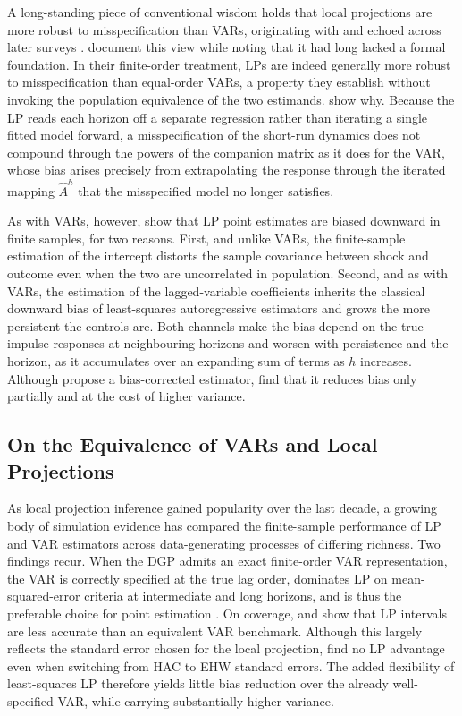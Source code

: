 A long-standing piece of conventional wisdom holds that local projections are more robust to
misspecification than VARs, originating with \textcite[162]{jorda2005estimation} and echoed across
later surveys \parencite{ramey2016macroeconomic,li2024local}. \textcite{plagborg2021local} document
this view while noting that it had long lacked a formal foundation. In their finite-order treatment,
LPs are indeed generally more robust to misspecification than equal-order VARs, a property they
establish without invoking the population equivalence of the two estimands. \textcite{olea2024double}
show why. Because the LP reads each horizon off a separate regression rather than iterating a single
fitted model forward, a misspecification of the short-run dynamics does not compound through the
powers of the companion matrix as it does for the VAR, whose bias arises precisely from
extrapolating the response through the iterated mapping $\hat A^{h}$ that the misspecified model no
longer satisfies.

As with VARs, however, \textcite{herbst2024bias} show that LP point estimates are biased downward in
finite samples, for two reasons. First, and unlike VARs, the finite-sample estimation of the
intercept distorts the sample covariance between shock and outcome even when the two are uncorrelated
in population. Second, and as with VARs, the estimation of the lagged-variable coefficients inherits
the classical downward bias of least-squares autoregressive estimators \parencite{pope1990biases} and
grows the more persistent the controls are. Both channels make the bias depend on the true impulse
responses at neighbouring horizons and worsen with persistence and the horizon, as it accumulates
over an expanding sum of terms as $h$ increases. Although \textcite{herbst2024bias} propose a
bias-corrected estimator, \textcite{li2024local} find that it reduces bias only partially and at the
cost of higher variance.

\subsection{On the Equivalence of VARs and Local Projections}

As local projection inference gained popularity over the last decade, a growing body of
simulation evidence has compared the finite-sample performance of LP and VAR estimators across
data-generating processes of differing richness. Two findings recur. When the DGP admits an exact
finite-order VAR representation, the VAR is correctly specified at the true lag order, dominates LP
on mean-squared-error criteria at intermediate and long horizons, and is thus the preferable choice
for point estimation \parencite{olea2024double,li2024local}. On coverage, \textcite{kilian2011reliable}
and \textcite{brugnolini2018local} show that LP intervals are less accurate than an equivalent VAR
benchmark. Although this largely reflects the standard error chosen for the local projection,
\textcite{olea2024double} find no LP advantage even when switching from HAC to EHW standard errors.
The added flexibility of least-squares LP therefore yields little bias reduction over the already
well-specified VAR, while carrying substantially higher variance.

